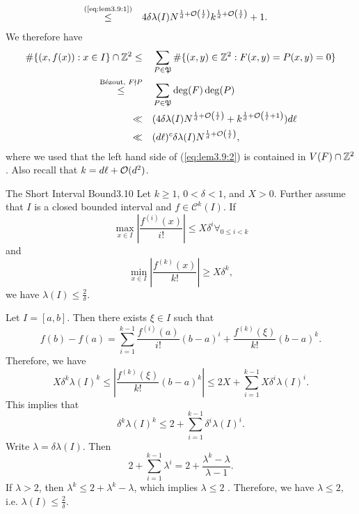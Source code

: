 \documentclass{Vorlesungstemplate_English} %
\begin{document}
\begin{pf}
\begin{align*}
  \stackrel{\text{(\ref{eq:lem3.9:1})}}{\leq} \quad &  4\delta\lambda(I)N^{\frac{1}{d}+\mathcal{O}\left(\frac{1}{\ell}\right)}k^{\frac{1}{d}+\mathcal{O}\left(\frac{1}{\ell}\right)}+1.\end{align*}
  We therefore have
  \begin{align*}
    \#\{ (x,f(x)): x \in I\} \cap \mathbb{Z}^2 \leq \quad & \sum_{P \in \mathfrak{P}} \#\{ (x,y) \in \mathbb{Z}^2: F(x,y)=P(x,y)=0\} \\
    \stackrel{\text{Bézout, } F \nmid P}{\leq} \quad & \sum_{P \in \mathfrak{P}} \deg(F)\deg(P) \\
    \ll \quad & (4\delta\lambda(I)N^{\frac{1}{d}+\mathcal{O}\left(\frac{1}{\ell}\right)}+k^{\frac{1}{d}+\mathcal{O}\left(\frac{1}{\ell}+1\right)})d\ell \\
    \ll \quad & (d\ell)^c\delta\lambda(I)N^{\frac{1}{d}+\mathcal{O}\left(\frac{1}{\ell}\right)},
  \end{align*}
  where we used that the left hand side of (\ref{eq:lem3.9:2}) is contained in $V(F) \cap \mathbb{Z}^2$. Also recall that $k = d\ell + \mathcal{O}(d^2)$.
\end{pf}
\begin{lemma}{The Short Interval Bound}{3.10}
  Let $k \geq 1$, $0 < \delta <  1$, and $X > 0$. Further assume that $I$ is a closed bounded interval and $f \in \mathcal{C}^k(I)$. If
  \[ \max_{x \in I}\left|\frac{f^{(i)}(x)}{i!}\right| \leq X\delta^i \forall_{0 \leq i < k}\]
  and
  \[ \min_{x \in I}\left|\frac{f^{(k)}(x)}{k!}\right| \geq X\delta^k,\]
  we have $\lambda(I) \leq \frac{2}{\delta}$.
\end{lemma}
\begin{pf}
  Let $I = [a,b]$. Then there exists $\xi \in I$ such that
  \[ f(b)-f(a) = \sum_{i=1}^{k-1}\frac{f^{(i)}(a)}{i!}(b-a)^i + \frac{f^{(k)}(\xi)}{k!}(b-a)^k.\]
  Therefore, we have
  \[ X\delta^k\lambda(I)^k \leq \left| \frac{f^{(k)}(\xi)}{k!}(b-a)^k\right| \leq 2X+\sum_{i=1}^{k-1}X\delta^i\lambda(I)^i.\]
  This implies that
  \[ \delta^k\lambda(I)^k \leq 2 + \sum_{i=1}^{k-1}\delta^i\lambda(I)^i.\]
  Write $\lambda = \delta\lambda(I)$. Then
  \[ 2 + \sum_{i=1}^{k-1}\lambda^i = 2 + \frac{\lambda^k-\lambda}{\lambda-1}.\]
  If $\lambda >2$, then $\lambda^k \leq 2 + \lambda^k-\lambda$, which implies $\lambda \leq 2$ \Lightning. Therefore, we have $\lambda \leq 2$, i.e. $\lambda(I) \leq \frac{2}{\delta}$.
\end{pf}
\end{document}
